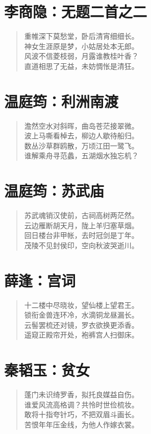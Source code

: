 \documentclass[12pt,oneside]{book}
\newenvironment{shici}{%
\begin{verse}\centering\yanti\large\hspace{12pt}}{\end{verse}}
\begin{document}
\begin{common-format}
\chapter{李商隐：无题二首之二}
\begin{shici}
重帷深下莫愁堂，卧后清宵细细长。\\
神女生涯原是梦，小姑居处本无郎。\\
风波不信菱枝弱，月露谁教桂叶香？\\
直道相思了无益，未妨惆怅是清狂。
\end{shici}

\chapter{温庭筠：利洲南渡}
\begin{shici}
澹然空水对斜晖，曲岛苍茫接翠微。\\
波上马嘶看棹去，柳边人歇待船归。\\
数丛沙草群鸥散，万顷江田一鹭飞。\\
谁解乘舟寻范蠡，五湖烟水独忘机？
\end{shici}

\chapter{温庭筠：苏武庙}
\begin{shici}
苏武魂销汉使前，古祠高树两茫然。\\
云边雁断胡天月，陇上羊归塞草烟。\\
回日楼台非甲帐，去时冠剑是丁年。\\
茂陵不见封侯印，空向秋波哭逝川。
\end{shici}

\chapter{薛逢：宫词}
\begin{shici}
十二楼中尽晓妆，望仙楼上望君王。\\
锁衔金兽连环冷，水滴铜龙昼漏长。\\
云髻罢梳还对镜，罗衣欲换更添香。\\
遥窥正殿帘开处，袍裤宫人扫御床。
\end{shici}

\chapter{秦韬玉：贫女}
\begin{shici}
蓬门未识绮罗香，拟托良媒益自伤。\\
谁爱风流高格调？共怜时世俭梳妆。\\
敢将十指夸针巧，不把双眉斗画长。\\
苦恨年年压金线，为他人作嫁衣裳。
\end{shici}


\end{common-format}
\end{document}
